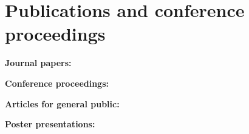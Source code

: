 \chapter{Publications and conference proceedings}
\label{app:AppendixA}
\thispagestyle{empty}
\noindent\textbf{Journal papers:}
%


\vspace{8mm}
\noindent\textbf{Conference proceedings:}



\vspace{8mm}
\noindent\textbf{Articles for general public:}

\vspace{5mm}


\vspace{8mm}
\noindent\textbf{Poster presentations:}

